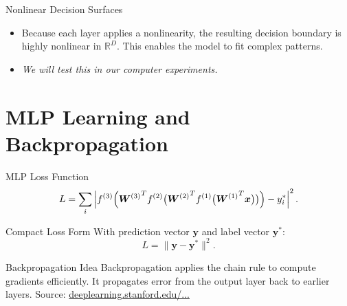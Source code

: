 \documentclass[10pt]{beamer}
\begin{document}
\begin{frame}{Nonlinear Decision Surfaces}
  \justifying
  \begin{itemize}
 
   \item Because each layer applies a nonlinearity, the resulting decision boundary is highly nonlinear in $\mathbb{R}^D$.
  This enables the model to fit complex patterns.
   \item \textit{We will test this in our computer experiments.} 
  \end{itemize}

\end{frame}


\section{MLP Learning and Backpropagation}

\begin{frame}{MLP Loss Function}
  \justifying
  \[
    L = \sum_i \left| f^{(3)}\Bigl( {\bm{W}^{(3)}}^T f^{(2)}\bigl( {\bm{W}^{(2)}}^T f^{(1)}\bigl( {\bm{W}^{(1)}}^T \bm{x} \bigr) \bigr) \Bigr) - y_i^* \right|^2.
  \]
\end{frame}

\begin{frame}{Compact Loss Form}
  \justifying
  With prediction vector $\bm{y}$ and label vector $\bm{y}^*$:
  \[
    L = \|\bm{y} - \bm{y}^*\|^2.
  \]
\end{frame}

\begin{frame}{Backpropagation Idea}
  \justifying
  Backpropagation applies the chain rule to compute gradients efficiently.
  It propagates error from the output layer back to earlier layers.
  \vspace{0.5em}
  \footnotesize
  Source: \href{http://deeplearning.stanford.edu/tutorial/supervised/MultiLayerNeuralNetworks/}{deeplearning.stanford.edu/...}
\end{frame}
\end{document}
